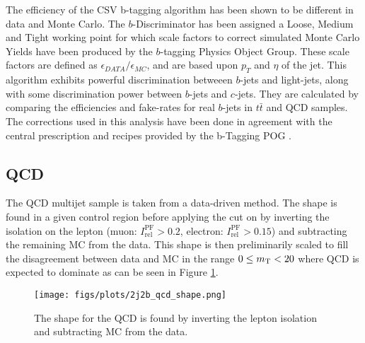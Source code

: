 

The efficiency of the CSV b-tagging algorithm has been shown to be different in data and Monte Carlo.
The $b$-Discriminator has been assigned a Loose, Medium and Tight working point for which scale 
factors to correct simulated Monte Carlo Yields have been produced by the $b$-tagging Physics Object Group.
These scale factors are defined as $\epsilon_{DATA}/\epsilon_{MC}$, and are based upon $p_{T}$ and $\eta$ of the jet. 
This algorithm exhibits powerful discrimination betweeen $b$-jets and light-jets, 
along with some discrimination power between $b$-jets and $c$-jets.
They are calculated by comparing the efficiencies and fake-rates for real $b$-jets in $t\bar{t}$ and QCD samples.
The corrections used in this analysis have been done in agreement with the central prescription and recipes provided 
by the b-Tagging POG \cite{BTAGNOTE}.

\subsection{QCD}
\label{sec:qcd}
The QCD multijet sample is taken from a data-driven method. 
The shape is found in a given control region before applying 
the cut on \MT  by inverting the isolation on the lepton (muon: $I_{\text{rel}}^{\text{PF}}>0.2$, electron: $I_{\text{rel}}^{\text{PF}}>0.15$) and subtracting the remaining MC from the data.
This shape is then preliminarily scaled to fill the disagreement between data and MC in the range $0\le m_\mathrm{T}<20$ where QCD is expected to dominate as can be seen in Figure \ref{fig:qcdshape}. 

\begin{figure}
 \center
 \texttt{[image: figs/plots/2j2b\_qcd\_shape.png]}
 \caption{The shape for the QCD is found by inverting the lepton isolation and subtracting MC from the data.}
 \label{fig:qcdshape}
\end{figure}
